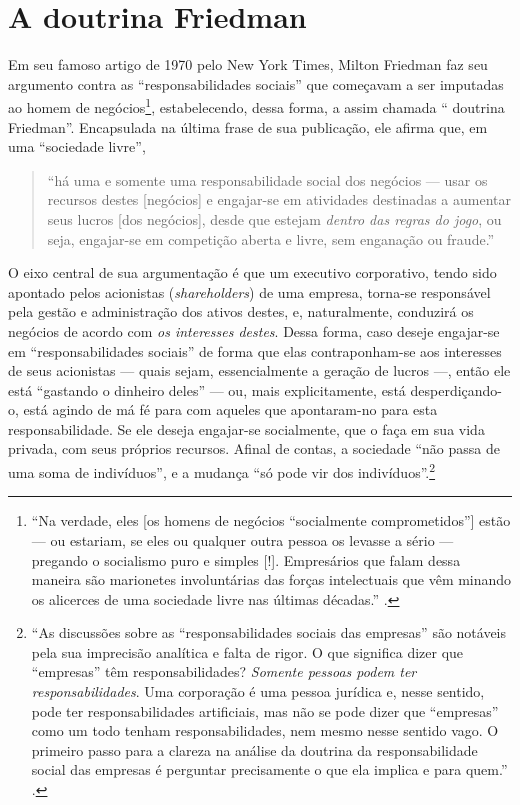 \documentclass[12pt]{article}
\begin{document}
\section{A doutrina Friedman}
Em seu famoso artigo de 1970 pelo New York Times, Milton Friedman faz seu argumento contra as ``responsabilidades sociais'' que começavam a ser imputadas ao homem de negócios\footnote{``Na verdade, eles [os homens de negócios ``socialmente comprometidos''] estão --- ou estariam, se eles ou qualquer outra pessoa os levasse a sério --- pregando o socialismo puro e simples [!]. Empresários que falam dessa maneira são marionetes involuntárias das forças intelectuais que vêm minando os alicerces de uma sociedade livre nas últimas décadas.'' \cite{Friedman1970}.}, estabelecendo, dessa forma, a assim chamada `` doutrina Friedman''. Encapsulada na última frase de sua publicação, ele afirma que, em uma ``sociedade livre'',
\begin{quote}
    ``há uma e somente uma responsabilidade social dos negócios --- usar os recursos destes [negócios] e engajar-se em atividades destinadas a aumentar seus lucros [dos negócios], desde que estejam \textit{dentro das regras do jogo}, ou seja, engajar-se em competição aberta e livre, sem enganação ou fraude.'' \cite[grifo meu]{Friedman1970}
\end{quote}


O eixo central de sua argumentação é que um executivo corporativo, tendo sido apontado pelos acionistas (\textit{shareholders}) de uma empresa, torna-se responsável pela gestão e administração dos ativos destes, e, naturalmente, conduzirá os negócios de acordo com \textit{os interesses destes}. Dessa forma, caso deseje engajar-se em ``responsabilidades sociais'' de forma que elas contraponham-se aos interesses de seus acionistas --- quais sejam, essencialmente a geração de lucros ---, então ele está ``gastando o dinheiro deles'' --- ou, mais explicitamente, está desperdiçando-o, está agindo de má fé para com aqueles que apontaram-no para esta responsabilidade. Se ele deseja engajar-se socialmente, que o faça em sua vida privada, com seus próprios recursos. Afinal de contas, a sociedade ``não passa de uma soma de indivíduos'', e a mudança ``só pode vir dos indivíduos''.\footnote{``As discussões sobre as “responsabilidades sociais das empresas” são notáveis pela sua imprecisão analítica e falta de rigor. O que significa dizer que “empresas” têm responsabilidades? \textit{Somente pessoas podem ter responsabilidades}. Uma corporação é uma pessoa jurídica e, nesse sentido, pode ter responsabilidades artificiais, mas não se pode dizer que “empresas” como um todo tenham responsabilidades, nem mesmo nesse sentido vago. O primeiro passo para a clareza na análise da doutrina da responsabilidade social das empresas é perguntar precisamente o que ela implica e para quem.'' \cite[grifo meu]{Friedman1970}.}
\end{document}
